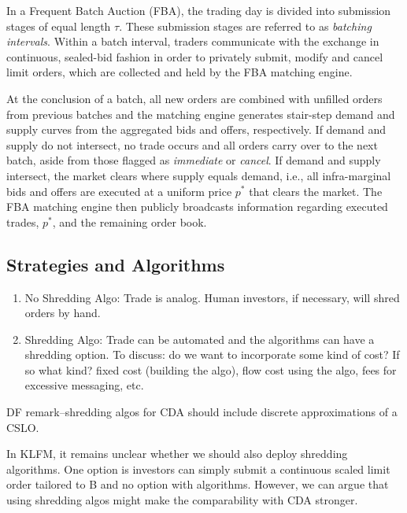 \documentclass{article}
\begin{document}


In a Frequent Batch Auction (FBA), the trading day is divided into submission stages of equal length $\tau$. These submission stages are referred to as \textit{batching intervals}. Within a batch interval, traders communicate with the exchange in continuous, sealed-bid fashion in order to privately submit, modify and cancel limit orders, which are collected and held by the FBA matching engine.

At the conclusion of a batch, all new orders are combined with unfilled orders from previous batches and the matching engine generates stair-step demand and supply curves from the aggregated bids and offers, respectively. If demand and supply do not intersect, no trade occurs and all orders carry over to the next batch, aside from those flagged as \textit{immediate} or \textit{cancel}. If demand and supply intersect, the market clears where supply equals demand, i.e., all infra-marginal bids and offers are executed at a uniform price $p^*$ that clears the market. The FBA matching engine then publicly broadcasts information regarding executed trades, $p^*$, and the remaining order book.


\subsection{Strategies and Algorithms}

\begin{enumerate}
    \item No Shredding Algo: Trade is analog. Human investors, if necessary, will shred orders by hand. 
    \item Shredding Algo: Trade can be automated and the algorithms can have a shredding option. To discuss: do we want to incorporate some kind of cost? If so what kind? fixed cost (building the algo), flow cost using the algo, fees for excessive messaging, etc.
\end{enumerate}

DF remark--shredding algos for CDA should include discrete approximations of a CSLO.

In KLFM, it remains unclear whether we should also deploy shredding algorithms. One option is investors can simply submit a continuous scaled limit order tailored to B and no option with algorithms. However, we can argue that using shredding algos might make the comparability with CDA stronger. 
\end{document}
